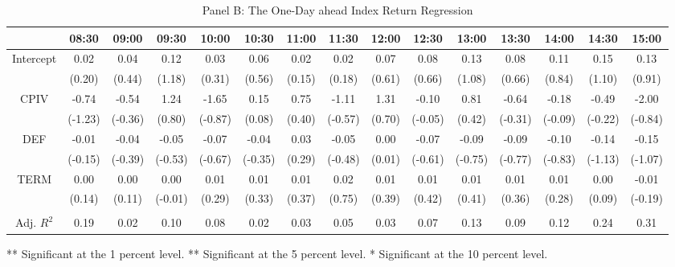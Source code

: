 \begin{table}[h]
\begin{threeparttable}
\begin{subtable}[t]{\linewidth}
\end{subtable}

\medskip
\begin{subtable}[t]{\linewidth}

\caption{Panel B: The One-Day ahead Index Return Regression }
\footnotesize
\begin{tabular}{ccccccccccccccc}
\toprule
          & 08:30   & 09:00   & 09:30   & 10:00   & 10:30   & 11:00  & 11:30   & 12:00  & 12:30   & 13:00   & 13:30   & 14:00   & 14:30   & 15:00   \\ \midrule
Intercept & 0.02    & 0.04    & 0.12    & 0.03    & 0.06    & 0.02   & 0.02    & 0.07   & 0.08    & 0.13    & 0.08    & 0.11    & 0.15    & 0.13    \\
          & (0.20)  & (0.44)  & (1.18)  & (0.31)  & (0.56)  & (0.15) & (0.18)  & (0.61) & (0.66)  & (1.08)  & (0.66)  & (0.84)  & (1.10)  & (0.91)  \\
CPIV      & -0.74   & -0.54   & 1.24    & -1.65   & 0.15    & 0.75   & -1.11   & 1.31   & -0.10   & 0.81    & -0.64   & -0.18   & -0.49   & -2.00   \\
          & (-1.23) & (-0.36) & (0.80)  & (-0.87) & (0.08)  & (0.40) & (-0.57) & (0.70) & (-0.05) & (0.42)  & (-0.31) & (-0.09) & (-0.22) & (-0.84) \\
DEF       & -0.01   & -0.04   & -0.05   & -0.07   & -0.04   & 0.03   & -0.05   & 0.00   & -0.07   & -0.09   & -0.09   & -0.10   & -0.14   & -0.15   \\
          & (-0.15) & (-0.39) & (-0.53) & (-0.67) & (-0.35) & (0.29) & (-0.48) & (0.01) & (-0.61) & (-0.75) & (-0.77) & (-0.83) & (-1.13) & (-1.07) \\
TERM      & 0.00    & 0.00    & 0.00    & 0.01    & 0.01    & 0.01   & 0.02    & 0.01   & 0.01    & 0.01    & 0.01    & 0.01    & 0.00    & -0.01   \\
          & (0.14)  & (0.11)  & (-0.01) & (0.29)  & (0.33)  & (0.37) & (0.75)  & (0.39) & (0.42)  & (0.41)  & (0.36)  & (0.28)  & (0.09)  & (-0.19) \\
          &         &         &         &         &         &        &         &        &         &         &         &         &         &         \\
Adj. $R^{2}$     & 0.19    & 0.02    & 0.10    & 0.08    & 0.02    & 0.03   & 0.05    & 0.03   & 0.07    & 0.13    & 0.09    & 0.12    & 0.24    & 0.31 \\ 
\bottomrule
\end{tabular}

\begin{tablenotes}
\item *** Significant at the 1 percent level.    
** Significant at the 5 percent level.   
* Significant at the 10 percent level.
\end{tablenotes}

\end{subtable}


\end{threeparttable}

\end{table}

